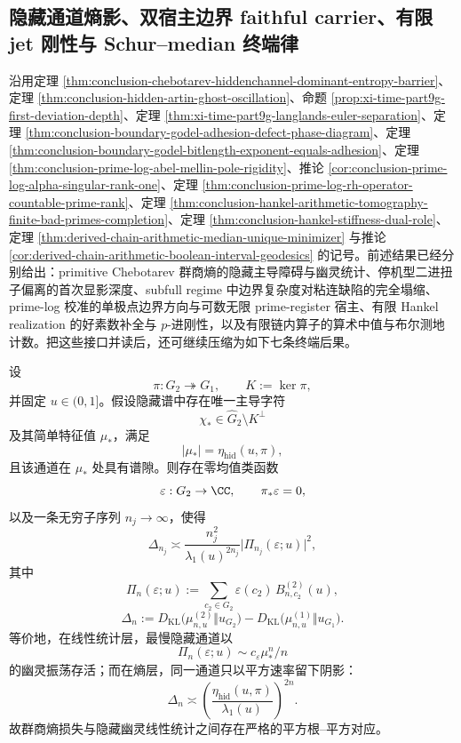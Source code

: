 \subsection{隐藏通道熵影、双宿主边界 faithful carrier、有限 jet 刚性与 Schur--median 终端律}\label{subsec:conclusion-hiddenchannel-boundarycarrier-finitejet-schur-median-rigidity}

沿用定理 \ref{thm:conclusion-chebotarev-hiddenchannel-dominant-entropy-barrier}、定理 \ref{thm:conclusion-hidden-artin-ghost-oscillation}、命题 \ref{prop:xi-time-part9g-first-deviation-depth}、定理 \ref{thm:xi-time-part9g-langlands-euler-separation}、定理 \ref{thm:conclusion-boundary-godel-adhesion-defect-phase-diagram}、定理 \ref{thm:conclusion-boundary-godel-bitlength-exponent-equals-adhesion}、定理 \ref{thm:conclusion-prime-log-abel-mellin-pole-rigidity}、推论 \ref{cor:conclusion-prime-log-alpha-singular-rank-one}、定理 \ref{thm:conclusion-prime-log-rh-operator-countable-prime-rank}、定理 \ref{thm:conclusion-hankel-arithmetic-tomography-finite-bad-primes-completion}、定理 \ref{thm:conclusion-hankel-stiffness-dual-role}、定理 \ref{thm:derived-chain-arithmetic-median-unique-minimizer} 与推论 \ref{cor:derived-chain-arithmetic-boolean-interval-geodesics} 的记号。前述结果已经分别给出：primitive Chebotarev 群商熵的隐藏主导障碍与幽灵统计、停机型二进扭子偏离的首次显影深度、subfull regime 中边界复杂度对粘连缺陷的完全塌缩、prime-log 校准的单极点边界方向与可数无限 prime-register 宿主、有限 Hankel realization 的好素数补全与 \(p\)-进刚性，以及有限链内算子的算术中值与布尔测地计数。把这些接口并读后，还可继续压缩为如下七条终端后果。

\begin{theorem}\label{thm:conclusion-hiddenchannel-square-root-square-law}
设
\[
\pi:G_2\twoheadrightarrow G_1,\qquad K:=\ker \pi,
\]
并固定 \(u\in(0,1]\)。假设隐藏谱中存在唯一主导字符
\[
\chi_\ast\in \widehat G_2\setminus K^\perp
\]
及其简单特征值 \(\mu_\ast\)，满足
\[
|\mu_\ast|=\eta_{\mathrm{hid}}(u,\pi),
\]
且该通道在 \(\mu_\ast\) 处具有谱隙。则存在零均值类函数
\[
\varepsilon:G_2\to\CC,
\qquad
\pi_\ast\varepsilon=0,
\]
以及一条无穷子序列 \(n_j\to\infty\)，使得
\[
\Delta_{n_j}
\asymp
\frac{n_j^2}{\lambda_1(u)^{2n_j}}
\bigl|\Pi_{n_j}(\varepsilon;u)\bigr|^2,
\]
其中
\[
\Pi_n(\varepsilon;u)
:=
\sum_{c_2\in G_2}\varepsilon(c_2)\,B_{n,c_2}^{(2)}(u),
\]
\[
\Delta_n
:=
D_{\mathrm{KL}}\!\bigl(\mu_{n,u}^{(2)}\Vert u_{G_2}\bigr)
-
D_{\mathrm{KL}}\!\bigl(\mu_{n,u}^{(1)}\Vert u_{G_1}\bigr).
\]
等价地，在线性统计层，最慢隐藏通道以
\[
\Pi_n(\varepsilon;u)\sim c_\varepsilon \mu_\ast^n/n
\]
的幽灵振荡存活；而在熵层，同一通道只以平方速率留下阴影：
\[
\Delta_n\asymp
\left(\frac{\eta_{\mathrm{hid}}(u,\pi)}{\lambda_1(u)}\right)^{2n}.
\]
故群商熵损失与隐藏幽灵线性统计之间存在严格的平方根--平方对应。
\end{theorem}

